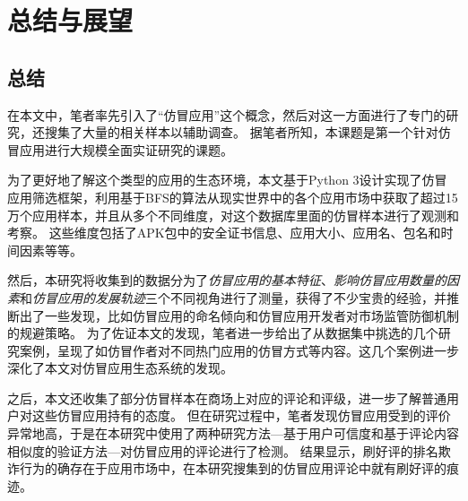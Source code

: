 \chapter{总结与展望}
\label{chp:future}

\section{总结}
在本文中，笔者率先引入了``仿冒应用''这个概念，然后对这一方面进行了专门的研究，还搜集了大量的相关样本以辅助调查。
据笔者所知，本课题是第一个针对仿冒应用进行大规模全面实证研究的课题。

为了更好地了解这个类型的应用的生态环境，本文基于Python 3设计实现了仿冒应用筛选框架\mytool，利用基于BFS的算法从现实世界中的各个应用市场中获取了超过15万个应用样本，并且从多个不同维度，对这个数据库里面的仿冒样本进行了观测和考察。
这些维度包括了APK包中的安全证书信息、应用大小、应用名、包名和时间因素等等。

然后，本研究将收集到的数据分为了\emph{仿冒应用的基本特征}、\emph{影响仿冒应用数量的因素}和\emph{仿冒应用的发展轨迹}三个不同视角进行了测量，获得了不少宝贵的经验，并推断出了一些发现，比如仿冒应用的命名倾向和仿冒应用开发者对市场监管防御机制的规避策略。
为了佐证本文的发现，笔者进一步给出了从数据集中挑选的几个研究案例，呈现了如仿冒作者对不同热门应用的仿冒方式等内容。这几个案例进一步深化了本文对仿冒应用生态系统的发现。

之后，本文还收集了部分仿冒样本在商场上对应的评论和评级，进一步了解普通用户对这些仿冒应用持有的态度。
但在研究过程中，笔者发现仿冒应用受到的评价异常地高，于是在本研究中使用了两种研究方法---基于用户可信度和基于评论内容相似度的验证方法---对仿冒应用的评论进行了检测。
结果显示，刷好评的排名欺诈行为的确存在于应用市场中，在本研究搜集到的仿冒应用评论中就有刷好评的痕迹。

